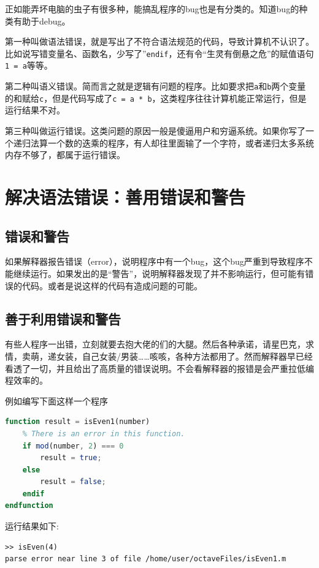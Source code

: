 \documentclass[12pt]{article}
\begin{document}
\begin{spacing}{1.4}
正如能弄坏电脑的虫子有很多种，能搞乱程序的bug也是有分类的。知道bug的种类有助于debug。

第一种叫做语法错误，就是写出了不符合语法规范的代码，导致计算机不认识了。比如说写错变量名、函数名，少写了”\texttt{endif}，还有令“生灵有倒悬之危”的赋值语句\texttt{1 = a}等等。

第二种叫语义错误。简而言之就是逻辑有问题的程序。比如要求把\texttt{a}和\texttt{b}两个变量的和赋给\texttt{c}，但是代码写成了\texttt{c = a * b}，这类程序往往计算机能正常运行，但是运行结果不对。

第三种叫做运行错误。这类问题的原因一般是傻逼用户和穷逼系统。如果你写了一个递归法算一个数的迭乘的程序，有人却往里面输了一个字符，或者递归太多系统内存不够了，都属于运行错误。

\section{解决语法错误：善用错误和警告}

\subsection{错误和警告}

如果解释器报告错误（error），说明程序中有一个bug，这个bug严重到导致程序不能继续运行。如果发出的是“警告”，说明解释器发现了并不影响运行，但可能有错误的代码。或者是说这样的代码有造成问题的可能。

\subsection{善于利用错误和警告}

有些人程序一出错，立刻就要去抱大佬的们的大腿。然后各种承诺，请星巴克，求情，卖萌，递女装，自己女装/男装……咳咳，各种方法都用了。然而解释器早已经看透了一切，并且给出了高质量的错误说明。不会看解释器的报错是会严重拉低编程效率的。

例如编写下面这样一个程序

\begin{lstlisting}[language=octave]
function result = isEven1(number)
    % There is an error in this function.
    if mod(number, 2) === 0
        result = true;
    else
        result = false;
    endif
endfunction
\end{lstlisting}

运行结果如下:

\begin{lstlisting}
>> isEven(4)
parse error near line 3 of file /home/user/octaveFiles/isEven1.m


\end{lstlisting}
\end{spacing}
\end{document}
